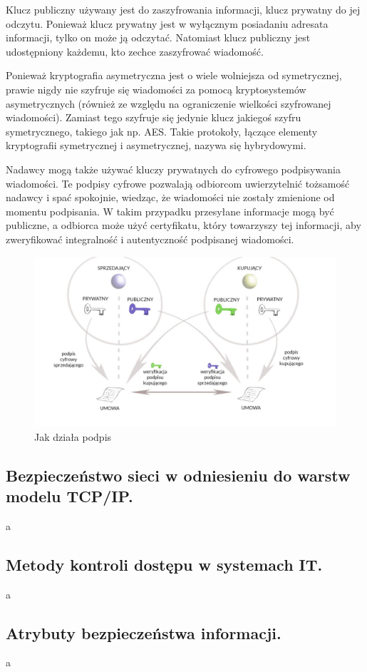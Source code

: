 \documentclass[a4paper,12pt,oneside]{book}
\begin{document}
				Klucz publiczny używany jest do zaszyfrowania informacji, klucz prywatny do jej odczytu. Ponieważ klucz prywatny jest w wyłącznym posiadaniu adresata informacji, tylko on może ją odczytać. Natomiast klucz publiczny jest udostępniony każdemu, kto zechce zaszyfrować wiadomość.
				
				Ponieważ kryptografia asymetryczna jest o wiele wolniejsza od symetrycznej, prawie nigdy nie szyfruje się wiadomości za pomocą kryptosystemów asymetrycznych (również ze względu na ograniczenie wielkości szyfrowanej wiadomości). Zamiast tego szyfruje się jedynie klucz jakiegoś szyfru symetrycznego, takiego jak np. AES. Takie protokoły, łączące elementy kryptografii symetrycznej i asymetrycznej, nazywa się hybrydowymi.
				
				Nadawcy mogą także używać kluczy prywatnych do cyfrowego podpisywania wiadomości. Te podpisy cyfrowe pozwalają odbiorcom uwierzytelnić tożsamość nadawcy i spać spokojnie, wiedząc, że wiadomości nie zostały zmienione od momentu podpisania. W takim przypadku przesyłane informacje mogą być publiczne, a odbiorca może użyć certyfikatu, który towarzyszy tej informacji, aby zweryfikować integralność i autentyczność podpisanej wiadomości.
				
				\begin{figure}[h]
					\centering\includegraphics[scale=0.35]{krypt_asym_podpis.png}
					\caption{Jak działa podpis}
				\end{figure}
				
			\newpage\subsection{\color{red}Bezpieczeństwo sieci w odniesieniu do warstw modelu TCP/IP.}
				a
			\newpage\subsection{\color{red}Metody kontroli dostępu w systemach IT.}
				a
			\newpage\subsection{\color{red}Atrybuty bezpieczeństwa informacji.}
				a
	
\end{document}
